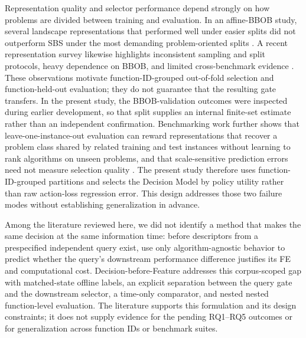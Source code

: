Representation quality and selector performance depend strongly on how
problems are divided between training and evaluation.  In an affine-BBOB study,
several landscape representations that performed well under easier splits did
not outperform SBS under the most demanding problem-oriented splits
\cite{cenikjLandscapeFeaturesSingleobjective2025}.  A recent representation
survey likewise highlights inconsistent sampling and split protocols, heavy
dependence on BBOB, and limited cross-benchmark evidence
\cite{cenikjSurveyFeaturesUsed2026}.  These observations motivate
function-ID-grouped out-of-fold selection and function-held-out evaluation;
they do not guarantee that the resulting gate transfers.  In the present
study, the BBOB-validation outcomes were inspected during earlier development,
so that split supplies an internal finite-set estimate rather than an
independent confirmation.
Benchmarking work further shows that leave-one-instance-out evaluation can
reward representations that recover a problem class shared by related training
and test instances without learning to rank algorithms on unseen problems, and
that scale-sensitive prediction errors need not measure selection quality
\cite{petelinPitfallsBenchmarkingAlgorithm2025}.  The present study therefore
uses function-ID-grouped partitions and selects the Decision Model by policy utility
rather than raw action-loss regression error.  This design addresses those two
failure modes without establishing generalization in advance.

Among the literature reviewed here, we did not identify a method that makes the
same decision at the same information time: before descriptors from a
prespecified independent query exist, use only algorithm-agnostic behavior to
predict whether the query's downstream performance difference justifies its FE
and computational cost.  Decision-before-Feature addresses this corpus-scoped
gap with matched-state offline labels, an explicit separation between the query
gate and the downstream selector, a time-only comparator, and nested
nested function-level evaluation.  The literature supports this formulation and its
design constraints; it does not supply evidence for the pending RQ1--RQ5
outcomes or for generalization across function IDs or benchmark suites.
